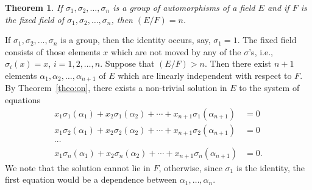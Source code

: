 \documentclass[11pt]{article}
\newtheorem{theo}{Theorem}
\theoremstyle{definition}
\begin{document}
\begin{theo}
\label{theo:onfo}
If $\sigma_1, \sigma_2, \ldots, \sigma_n$ is a group of automorphisms of a field $E$ and if $F$ is the fixed field of $\sigma_1, \sigma_2, \ldots, \sigma_n$, then $(E/F) = n$.
\end{theo}

If $\sigma_1, \sigma_2, \ldots, \sigma_n$ is a group, then the identity occurs, say, $\sigma_1 = 1$.
The fixed field consists of those elements $x$ which are not moved by any of the $\sigma$'s, i.e., $\sigma_i(x) = x$, $i = 1,2,\ldots,n$.
Suppose that $(E/F) > n$.
Then there exist $n+1$ elements $\alpha_1, \alpha_2, \ldots, \alpha_{n+1}$ of $E$ which are linearly independent with respect to $F$.
By Theorem~\ref{theo:on}, there exists a non-trivial solution in $E$ to the system of equations
\begin{equation}
\tag{'}
\begin{aligned}
x_1 \sigma_1(\alpha_1) + 
x_2 \sigma_1(\alpha_2) + 
\cdots +
x_{n+1} \sigma_{1}(\alpha_{n+1}) &= 0
\\
x_1 \sigma_2(\alpha_1) + 
x_2 \sigma_2(\alpha_2) + 
\cdots +
x_{n+1} \sigma_{2}(\alpha_{n+1}) &= 0
\\
\cdots &
\\
x_1 \sigma_{n}(\alpha_1) + 
x_2 \sigma_{n}(\alpha_2) + 
\cdots +
x_{n+1} \sigma_{n}(\alpha_{n+1}) &= 0.
\end{aligned}
\end{equation}
We note that the solution cannot lie in $F$, otherwise, since $\sigma_1$ is the identity, the first equation would be a dependence between $\alpha_1, \ldots, \alpha_n$.
\end{document}
